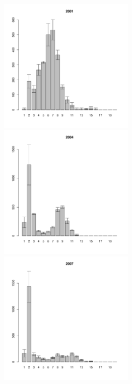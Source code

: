 \documentclass[12pt, a4paper]{article}
\begin{document}
\begin{figure}[h]

\begin{multicols}{3}
\hfill
\includegraphics[width=65mm]{../White_Sea/Estuatiy_Luvenga/sizestr_2001_.pdf}
\hfill
\includegraphics[width=65mm]{../White_Sea/Estuatiy_Luvenga/sizestr_2004_.pdf}
\hfill
\includegraphics[width=65mm]{../White_Sea/Estuatiy_Luvenga/sizestr_2007_.pdf}
\end{multicols}


\end{figure}
\end{document}
